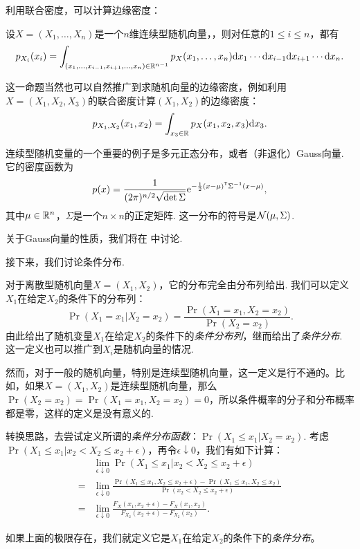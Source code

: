 利用联合密度，可以计算边缘密度：
\begin{proposition}\label{prop:continuous-marginal}
    设$X=(X_1,\dots,X_n)$是一个$n$维连续型随机向量，，则对任意的$1\leq i\leq n$，都有
    \[p_{X_i}(x_i)=\int_{(x_1,\dots,x_{i-1},x_{i+1},\dots,x_n)\in\mathbb{R}^{n-1}}p_X(x_1,\dots,x_n)\mathrm{d} x_1\cdots\mathrm{d} x_{i-1}\mathrm{d} x_{i+1}\cdots\mathrm{d} x_n.\]
\end{proposition}

这一命题当然也可以自然推广到求随机向量的边缘密度，例如利用$X=(X_1,X_2,X_3)$的联合密度计算$(X_1,X_2)$的边缘密度：
\[
    p_{X_1,X_2}(x_1,x_2) = \int_{x_3\in\mathbb{R}}p_X(x_1,x_2,x_3)\mathrm{d} x_3.
\]

连续型随机变量的一个重要的例子是多元正态分布，或者（非退化）Gauss向量. 它的密度函数为
\[p(x)=\frac{1}{(2\pi)^{n/2}\sqrt{\det\Sigma}}\mathrm{e}^{-\frac{1}{2}(x-\mu)^{\mathsf{T}}\Sigma^{-1}(x-\mu)},\]
其中$\mu\in\mathbb{R}^n$，$\Sigma$是一个$n\times n$的正定矩阵. 这一分布的符号是$\mathcal{N}(\mu,\Sigma)$. 

关于Gauss向量的性质，我们将在 中讨论. 

接下来，我们讨论条件分布. 

对于离散型随机向量$X=(X_1,X_2)$，它的分布完全由分布列给出. 我们可以定义$X_1$在给定$X_2$的条件下的分布列：
\[\Pr(X_1=x_1|X_2=x_2)=\frac{\Pr(X_1=x_1,X_2=x_2)}{\Pr(X_2=x_2)}.\]
由此给出了随机变量$X_1$在给定$X_2$的条件下的\emph{条件分布列}，继而给出了\emph{条件分布}. 这一定义也可以推广到$X_i$是随机向量的情况. 

然而，对于一般的随机向量，特别是连续型随机向量，这一定义是行不通的。比如，如果$X=(X_1,X_2)$是连续型随机向量，那么 $\Pr(X_2=x_2)=\Pr(X_1=x_1,X_2=x_2)=0$，所以条件概率的分子和分布概率都是零，这样的定义是没有意义的. 

转换思路，去尝试定义所谓的\emph{条件分布函数}：$\Pr(X_1\leq x_1|X_2=x_2)$. 考虑$\Pr(X_1\leq x_1|x_2< X_2\leq x_2+\epsilon)$，再令$\epsilon\downarrow 0$，我们有如下计算：
\begin{align*}
    &\lim_{\epsilon\downarrow 0}\Pr(X_1\leq x_1|x_2< X_2\leq x_2+\epsilon) \\
    =&\lim_{\epsilon\downarrow 0}\frac{\Pr(X_1\leq x_1,X_2\leq x_2+\epsilon)-\Pr(X_1\leq x_1,X_2\leq x_2)}{\Pr(x_2< X_2\leq x_2+\epsilon)}\\
    =&\lim_{\epsilon\downarrow 0}\frac{F_X(x_1,x_2+\epsilon)-F_X(x_1,x_2)}{F_{X_2}(x_2+\epsilon)-F_{X_2}(x_2)}.
\end{align*}

如果上面的极限存在，我们就定义它是$X_1$在给定$X_2$的条件下的\emph{条件分布}。


